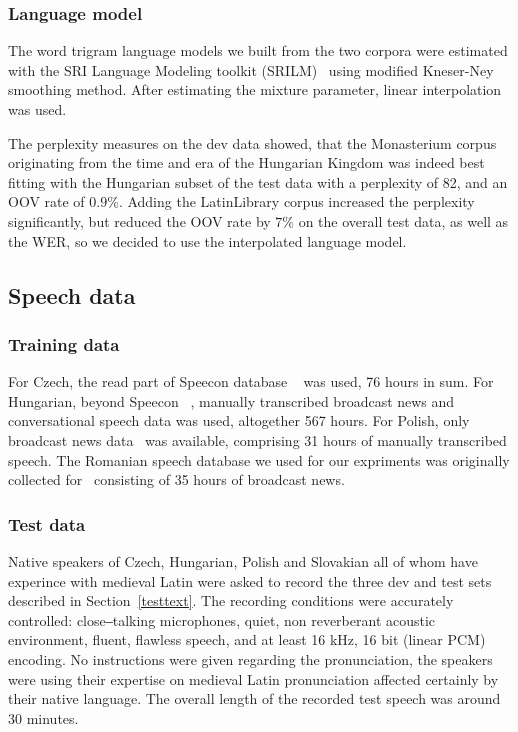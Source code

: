 \documentclass[runningheads,a4paper]{llncs}
\begin{document}
\subsubsection{Language model}
The word trigram language models we built from the two corpora were estimated with the SRI Language Modeling toolkit (SRILM)~\cite{srilm} using modified Kneser-Ney smoothing method.
After estimating the mixture parameter, linear interpolation was used.

The perplexity measures on the dev data showed, that the Monasterium corpus originating from the time and era of the Hungarian Kingdom was indeed best fitting with the Hungarian subset of the test data with a perplexity of 82, and an OOV rate of $0.9\%$.
Adding the LatinLibrary corpus increased the perplexity significantly, but reduced the OOV rate by $7\%$ on the overall test data, as well as the WER, so we decided to use the interpolated language model.

\subsection{Speech data}
\subsubsection{Training data}
For Czech, the read part of Speecon database ~\cite{czech} was used, 76 hours in sum. For Hungarian, beyond Speecon ~\cite{hungarian}, manually transcribed broadcast news and conversational speech data was used, altogether 567 hours.
For Polish, only broadcast news data~\cite{romanian} was available, comprising 31 hours of manually transcribed speech.
The Romanian speech database we used for our expriments was originally collected for~\cite{romanian} consisting of 35 hours of broadcast news.
\subsubsection{Test data}
Native speakers of Czech, Hungarian, Polish and Slovakian all of whom have experince with medieval Latin were asked to record the three dev and test sets described in Section~\ref{testtext}.
The recording conditions were accurately controlled: close‒talking microphones, quiet, non reverberant acoustic environment, fluent, flawless speech, and at least 16 kHz, 16 bit (linear PCM) encoding.
No instructions were given regarding the pronunciation, the speakers were using their expertise on medieval Latin pronunciation affected certainly by their native language.
The overall length of the recorded test speech was around 30 minutes.
\end{document}
